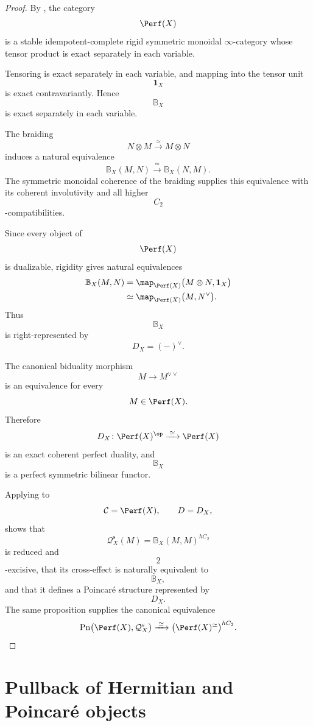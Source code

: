 \begin{proof}
By
,
the category
\[
    \Perf(X)
\]
is a stable idempotent-complete rigid symmetric monoidal
$\infty$-category whose tensor product is exact separately in each
variable.

Tensoring is exact separately in each variable, and mapping into the
tensor unit
\[
    \mathbf 1_X
\]
is exact contravariantly. Hence
\[
    \mathbb B_X
\]
is exact separately in each variable.

The braiding
\[
    N\otimes M
    \xrightarrow{\;\simeq\;}
    M\otimes N
\]
induces a natural equivalence
\[
    \mathbb B_X(M,N)
    \xrightarrow{\;\simeq\;}
    \mathbb B_X(N,M).
\]
The symmetric monoidal coherence of the braiding supplies this equivalence
with its coherent involutivity and all higher
\[
    C_2
\]
-compatibilities.

Since every object of
\[
    \Perf(X)
\]
is dualizable, rigidity gives natural equivalences
\[
\begin{aligned}
    \mathbb B_X(M,N)
    &=
    \map_{\Perf(X)}
    \bigl(
        M\otimes N,
        \mathbf 1_X
    \bigr)
    \\
    &\simeq
    \map_{\Perf(X)}
    \bigl(
        M,
        N^\vee
    \bigr).
\end{aligned}
\]
Thus
\[
    \mathbb B_X
\]
is right-represented by
\[
    D_X=(-)^\vee.
\]

The canonical biduality morphism
\[
    M
    \longrightarrow
    M^{\vee\vee}
\]
is an equivalence for every
\[
    M\in\Perf(X).
\]
Therefore
\[
    D_X
    \colon
    \Perf(X)^{\op}
    \xrightarrow{\;\simeq\;}
    \Perf(X)
\]
is an exact coherent perfect duality, and
\[
    \mathbb B_X
\]
is a perfect symmetric bilinear functor.

Applying
to
\[
    \mathcal C=\Perf(X),
    \qquad
    D=D_X,
\]
shows that
\[
    \mathcal Q_X^{\mathrm s}(M)
    =
    \mathbb B_X(M,M)^{hC_2}
\]
is reduced and
\[
    2
\]
-excisive, that its cross-effect is naturally equivalent to
\[
    \mathbb B_X,
\]
and that it defines a Poincar\'e structure represented by
\[
    D_X.
\]
The same proposition supplies the canonical equivalence
\[
    \operatorname{Pn}
    \bigl(
        \Perf(X),
        \mathcal Q_X^{\mathrm s}
    \bigr)
    \xrightarrow{\;\simeq\;}
    \bigl(
        \Perf(X)^\simeq
    \bigr)^{hC_2}.
\]
\end{proof}

\section{Pullback of Hermitian and Poincar\'e objects}
\label{sec:pullback-hermitian-poincare}


